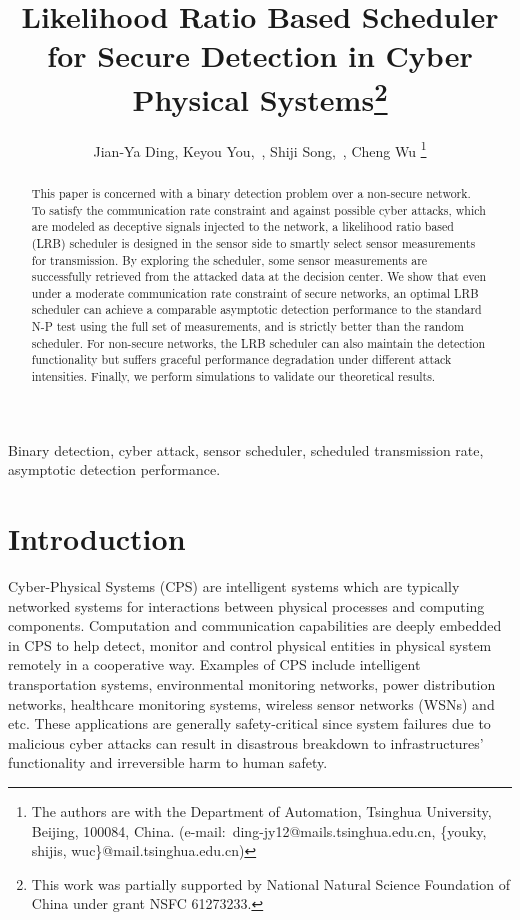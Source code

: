 \documentclass[journal]{IEEEtran}
\begin{document}
\title{Likelihood Ratio Based Scheduler for Secure Detection in Cyber Physical Systems\thanks{This work was partially
supported by National Natural Science Foundation of China under grant NSFC 61273233.}}

\author{Jian-Ya Ding,
        Keyou You,~,  Shiji Song,~, Cheng Wu
\thanks{The authors are with the Department of Automation, Tsinghua University, Beijing, 100084, China. (e-mail:~ding-jy12@mails.tsinghua.edu.cn, \{youky, shijis, wuc\}@mail.tsinghua.edu.cn)}}
\maketitle

\begin{abstract}
This paper is concerned with a binary detection problem over a non-secure network. To satisfy the communication rate constraint and against possible cyber attacks, which are modeled as deceptive signals injected to the network, a likelihood ratio based (LRB) scheduler is designed in the sensor side to smartly select sensor measurements for transmission. By exploring the scheduler,  some sensor measurements are successfully retrieved  from the attacked data at the decision center. We show that even under a moderate communication rate constraint of secure networks, an optimal LRB scheduler can achieve a comparable asymptotic detection performance to the standard N-P test using the full set of measurements,  and is strictly better than the random scheduler. For non-secure networks, the LRB scheduler can also maintain the detection functionality but suffers graceful performance degradation under different attack intensities. Finally, we perform simulations to validate our theoretical results.

\end{abstract}


\begin{IEEEkeywords}
Binary detection, cyber attack, sensor scheduler, scheduled transmission rate, asymptotic detection performance.
\end{IEEEkeywords}
\IEEEpeerreviewmaketitle

\section{Introduction}

Cyber-Physical Systems (CPS) are intelligent systems which are typically  networked systems for interactions between physical processes and computing components. Computation and communication capabilities are deeply embedded in CPS to help detect, monitor and control physical entities in physical system remotely in a cooperative way. Examples of CPS include intelligent transportation systems, environmental monitoring networks, power distribution networks, healthcare monitoring systems, wireless sensor networks (WSNs) and etc. These applications are generally safety-critical since system failures due to malicious cyber attacks can result in disastrous breakdown to infrastructures' functionality and irreversible harm to human safety.
\end{document}
